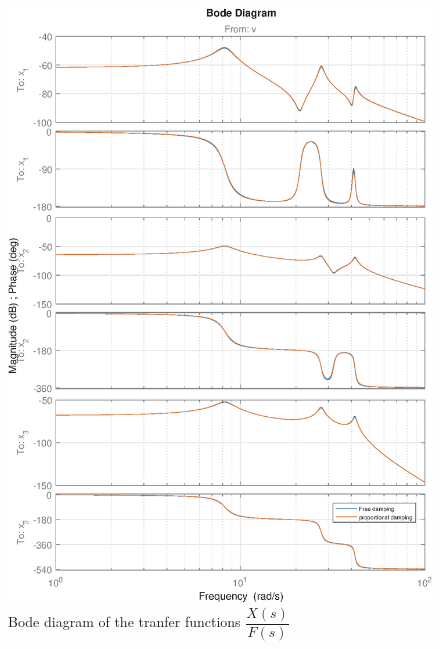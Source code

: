 \documentclass[twosided,a4paper]{article}           %
\begin{document}
\begin{figure}[H]
	\centering
	\includegraphics[width=\linewidth]{img/bode_fp}
	\caption{Bode diagram of the tranfer functions $\dfrac{X(s)}{F(s)}$}
	\label{fig:bode_fp}
\end{figure}
\end{document}
